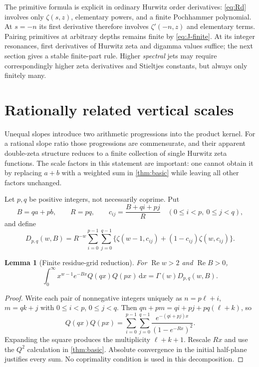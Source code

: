 \documentclass[11pt,a4paper]{article}
\newtheorem{lemma}[theorem]{Lemma}
\theoremstyle{definition}
\numberwithin{equation}{section}
\newcommand{\Rea}{\operatorname{Re}}
\newcommand{\dd}{\,\mathrm d}
\begin{document}
The primitive formula is explicit in ordinary Hurwitz order derivatives:
\eqref{eq:Rd} involves only $\zeta(s,z)$, elementary powers, and a finite
Pochhammer polynomial. At $s=-n$ its first derivative therefore involves
$\zeta'(-n,z)$ and elementary terms. Pairing primitives at arbitrary
depths remains finite by \eqref{eq:J-finite}. At its integer resonances,
first derivatives of Hurwitz zeta and digamma values suffice; the next
section gives a stable finite-part rule. Higher \emph{spectral} jets may
require correspondingly higher zeta derivatives and Stieltjes constants,
but always only finitely many.

\section{Rationally related vertical scales}
\label{sec:rational-scales}

Unequal slopes introduce two arithmetic progressions into the product
kernel. For a rational slope ratio those progressions are commensurate,
and their apparent double-zeta structure reduces to a finite collection
of single Hurwitz zeta functions. The scale factors in this statement
are important: one cannot obtain it by replacing $a+b$ with a weighted
sum in \cref{thm:basic} while leaving all other factors unchanged.

Let $p,q$ be positive integers, not necessarily coprime. Put
\begin{equation}\label{eq:rational-grid}
 B=qa+pb,\qquad R=pq,\qquad
 c_{ij}=\frac{B+qi+pj}{R}\quad(0\le i<p,\ 0\le j<q),
\end{equation}
and define
\begin{equation}\label{eq:Dpq}
 D_{p,q}(w,B)=R^{-w}\sum_{i=0}^{p-1}\sum_{j=0}^{q-1}
       \{\zeta(w-1,c_{ij})+(1-c_{ij})\zeta(w,c_{ij})\}.
\end{equation}

\begin{lemma}[Finite residue-grid reduction]\label{thm:grid}
For $\Rea w>2$ and $\Rea B>0$,
\begin{equation}\label{eq:QQ-grid}
 \int_0^\infty x^{w-1}e^{-Bx}Q(qx)Q(px)\dd x
                 =\Gamma(w)D_{p,q}(w,B).
\end{equation}
\end{lemma}
\begin{proof}
Write each pair of nonnegative integers uniquely as
$n=p\ell+i$, $m=qk+j$ with $0\le i<p$, $0\le j<q$.
Then $qn+pm=qi+pj+pq(\ell+k)$, so
\[
 Q(qx)Q(px)=\sum_{i=0}^{p-1}\sum_{j=0}^{q-1}
              \frac{e^{-(qi+pj)x}}{(1-e^{-Rx})^2}.
\]
Expanding the square produces the multiplicity $\ell+k+1$.
Rescale $Rx$ and use the $Q^2$ calculation in \cref{thm:basic}.
Absolute convergence in the initial half-plane justifies every sum.
No coprimality condition is used in this decomposition.
\end{proof}
\end{document}
